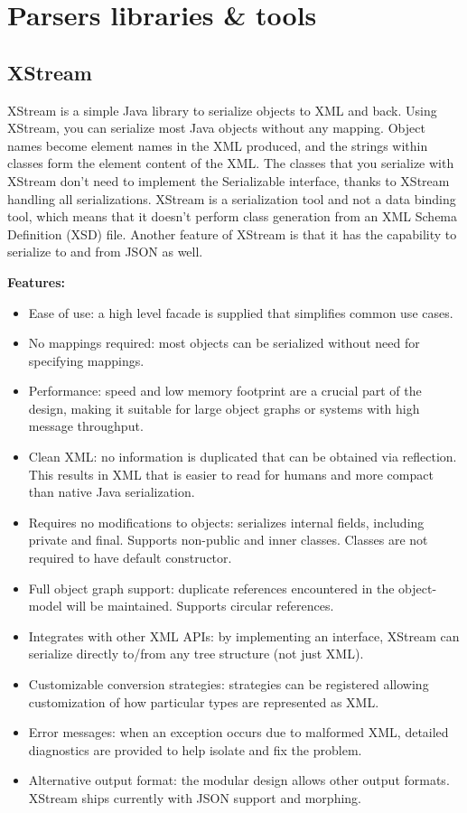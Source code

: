 \section{Parsers libraries \& tools}

\subsection{XStream}
XStream is a simple Java library to serialize objects to XML and back. Using XStream, you can serialize most Java objects without any mapping. Object names become element names in the XML produced, and the strings within classes form the element content of the XML.
\newline
\newline
The classes that you serialize with XStream don't need to implement the Serializable interface, thanks to XStream handling all serializations. XStream is a serialization tool and not a data binding tool, which means that it doesn't perform class generation from an XML Schema Definition (XSD) file.
\newline
\newline
Another feature of XStream is that it has the capability to serialize to and from JSON as well.

\textbf{Features:}
\begin{itemize}
\item{}Ease of use: a high level facade is supplied that simplifies common use cases.
\item{}No mappings required: most objects can be serialized without need for specifying mappings.
\item{}Performance: speed and low memory footprint are a crucial part of the design, making it suitable for large object graphs or systems with high message throughput.
\item{}Clean XML: no information is duplicated that can be obtained via reflection. This results in XML that is easier to read for humans and more compact than native Java serialization.
\item{}Requires no modifications to objects: serializes internal fields, including private and final. Supports non-public and inner classes. Classes are not required to have default constructor.
\item{}Full object graph support: duplicate references encountered in the object-model will be maintained. Supports circular references.
\item{}Integrates with other XML APIs: by implementing an interface, XStream can serialize directly to/from any tree structure (not just XML).
\item{}Customizable conversion strategies: strategies can be registered allowing customization of how particular types are represented as XML.
\item{}Error messages: when an exception occurs due to malformed XML, detailed diagnostics are provided to help isolate and fix the problem.
\item{}Alternative output format: the modular design allows other output formats. XStream ships currently with JSON support and morphing.
\end{itemize}

